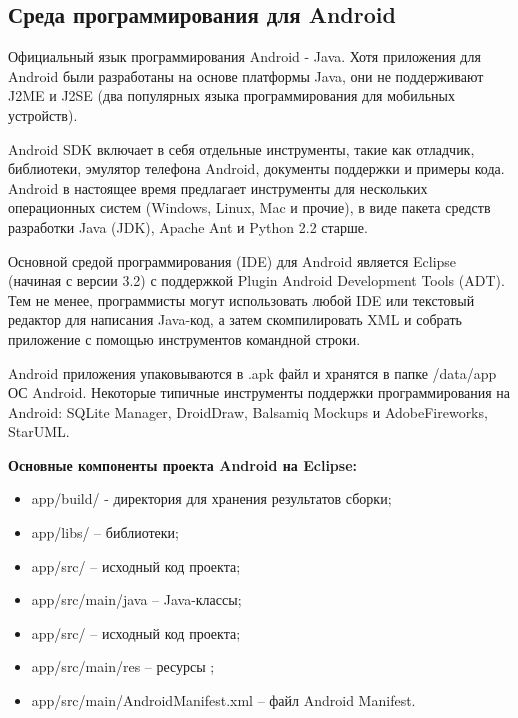 \subsection{Среда программирования для Android}
Официальный язык программирования Android - Java. Хотя приложения для Android были разработаны на основе платформы Java, они не поддерживают J2ME и J2SE (два популярных языка программирования для мобильных устройств).

Android SDK включает в себя отдельные инструменты, такие как отладчик, библиотеки, эмулятор телефона Android, документы поддержки и примеры кода. Android в настоящее время предлагает инструменты для нескольких операционных систем (Windows, Linux, Mac и прочие), в виде пакета средств разработки Java (JDK), Apache Ant и Python 2.2 старше.

Основной средой программирования (IDE) для Android является Eclipse (начиная с версии 3.2) с поддержкой Plugin Android Development Tools (ADT). Тем не менее, программисты могут использовать любой IDE или текстовый редактор для написания Java-код, а затем скомпилировать XML и собрать приложение с помощью инструментов командной строки.

Android приложения упаковываются в .apk файл и хранятся в папке  /data/app  ОС Android. Некоторые типичные инструменты поддержки программирования на Android: SQLite Manager, DroidDraw, Balsamiq Mockups и AdobeFireworks, StarUML.

\textbf{Основные компоненты проекта Android на Eclipse:}


\begin{itemize}
  \item app/build/ - директория для хранения результатов сборки;
	\item app/libs/ – библиотеки;
	\item app/src/ – исходный код проекта;
	\item app/src/main/java – Java-классы;
	\item app/src/ – исходный код проекта;
	\item app/src/main/res – ресурсы ;
	\item app/src/main/AndroidManifest.xml – файл Android Manifest.
\end{itemize}

